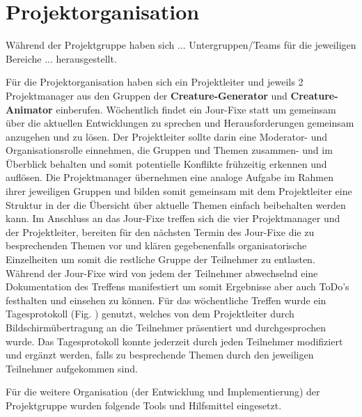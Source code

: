 \section{Projektorganisation}

Während der Projektgruppe haben sich ... Untergruppen/Teams für die jeweiligen Bereiche ... herausgestellt.

Für die Projektorganisation haben sich ein Projektleiter und jeweils 2 Projektmanager aus den Gruppen der \textbf{Creature-Generator} und \textbf{Creature-Animator} einberufen. Wöchentlich findet ein Jour-Fixe statt um gemeinsam über die aktuellen Entwicklungen zu sprechen und Herausforderungen gemeinsam anzugehen und zu lösen. Der Projektleiter sollte darin eine Moderator- und Organisationsrolle einnehmen, die Gruppen und Themen zusammen- und im Überblick behalten und somit potentielle Konflikte frühzeitig erkennen und auflösen. Die Projektmanager übernehmen eine analoge Aufgabe im Rahmen ihrer jeweiligen Gruppen und bilden somit gemeinsam mit dem Projektleiter eine Struktur in der die Übersicht über aktuelle Themen einfach beibehalten werden kann. Im Anschluss an das Jour-Fixe treffen sich die vier Projektmanager und der Projektleiter, bereiten für den nächsten Termin des Jour-Fixe die zu besprechenden Themen vor und klären gegebenenfalls organisatorische Einzelheiten um somit die restliche Gruppe der Teilnehmer zu entlasten. Während der Jour-Fixe wird von jedem der Teilnehmer abwechselnd eine Dokumentation des Treffens manifestiert um somit Ergebnisse aber auch ToDo's festhalten und einsehen zu können. Für das wöchentliche Treffen wurde ein Tagesprotokoll (Fig. ) genutzt, welches von dem Projektleiter durch Bildschirmübertragung an die Teilnehmer präsentiert und durchgesprochen wurde. Das Tagesprotokoll konnte jederzeit durch jeden Teilnehmer modifiziert und ergänzt werden, falls zu besprechende Themen durch den jeweiligen Teilnehmer aufgekommen sind.

Für die weitere Organisation (der Entwicklung und Implementierung) der Projektgruppe wurden folgende Tools und Hilfsmittel eingesetzt. 

